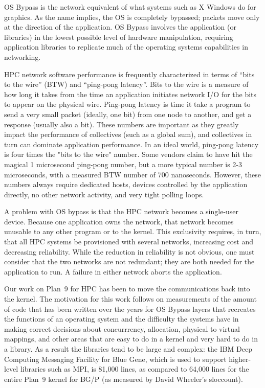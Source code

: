 \documentclass[letterpaper,twocolumn,10pt]{article}
\begin{document}
OS Bypass is the network equivalent of what systems such as X Windows do for graphics. 
As the name implies, the OS is completely bypassed; packets move only at the 
direction of the application. OS Bypass involves the application (or libraries) in the
lowest possible level of hardware manipulation, requiring
application libraries to replicate much of the operating systems
capabilities in networking. 

HPC network software performance is frequently characterized in terms of ``bits to the wire'' (BTW) and ``ping-pong latency''. 
Bits to the wire is a measure of how long it takes
from the time an application initiates
network I/O for the bits to appear on the physical wire. Ping-pong latency 
is time it take a program to send a very small packet (ideally, one bit) from 
one node to another, and get a response (usually also a bit). 
These numbers are important as they greatly impact the performance of collectives (such as a global sum), 
and collectives in turn can dominate application performance\cite{petrini}\cite{ 10.1109/HPC.1997.592137}\cite{quadrics}.
In an ideal world, ping-pong latency is four times the "bits to the wire" number. 
Some vendors claim to have hit the magical 1 microsecond ping-pong number, but a more typical 
number is 2-3 microseconds, with a measured BTW number of 700 nanoseconds. 
However, these numbers always require dedicated hosts, devices
controlled by the application directly, no other network activity, 
and very tight polling loops. 

A problem with OS bypass is that the HPC network becomes a single-user device. Because one application 
owns the network, that network becomes unusable to any other program or to the kernel. This exclusivity requires, in turn, that all
HPC systems be provisioned with several networks, increasing cost and decreasing reliability. While the reduction in reliability is not obvious, one must consider 
that the two networks are not redundant; they are both needed for the application
to run. A failure in either network aborts the application.

Our work on Plan~9 for HPC has been to move the communications back into the kernel. The motivation 
for this work follows on measurements of the amount of  code that has been written over the years for OS Bypass layers that recreates the functions of an operating system 
and the difficulty the systems have in making correct decisions about concurrrency, allocation, physical to virtual mappings, and other 
areas that are easy to do in a kernel and very hard to do in a library. As a result the libraries tend to be large and complex: the IBM Deep Computing Messaging Facility for Blue Gene, which is used to support
higher-level libraries such as MPI, is 81,000 lines, as compared to 64,000 lines for the entire Plan~9 kernel  for BG/P (as measured by David Wheeler's sloccount). 
\end{document}
